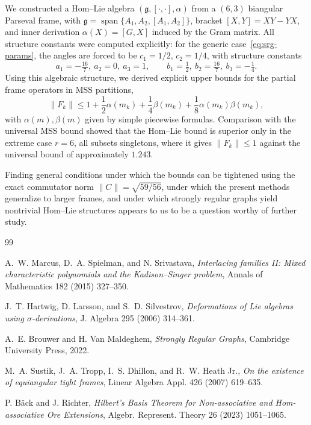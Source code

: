 \documentclass[a4paper]{amsart}
\theoremstyle{plain}
\theoremstyle{definition}
\theoremstyle{remark}
\newcommand{\g}{\mathfrak{g}}
\begin{document}
	We constructed a Hom--Lie algebra $(\g, [\cdot,\cdot], \alpha)$ from a $(6,3)$ biangular Parseval frame, with $\g = \operatorname{span}\{A_1, A_2, [A_1,A_2]\}$, bracket $[X,Y] = XY - YX$, and inner derivation $\alpha(X) = [G,X]$ induced by the Gram matrix. All structure constants were computed explicitly: for the generic case~\eqref{eq:srg-params}, the angles are forced to be $c_1=1/2$, $c_2=1/4$, with structure constants
	\[
	a_1=-\tfrac{16}{7},\ a_2=0,\ a_3=1,\qquad b_1=\tfrac{1}{2},\ b_2=\tfrac{16}{7},\ b_3=-\tfrac{1}{4}.
	\]
	Using this algebraic structure, we derived explicit upper bounds for the partial frame operators in MSS partitions,
	\[
	\|F_k\| \le 1 + \frac{1}{2}\alpha(m_k) + \frac{1}{4}\beta(m_k) + \frac{1}{8}\alpha(m_k)\beta(m_k),
	\]
	with $\alpha(m),\beta(m)$ given by simple piecewise formulas. Comparison with the universal MSS bound showed that the Hom--Lie bound is superior only in the extreme case $r=6$, all subsets singletons, where it gives $\|F_k\| \le 1$ against the universal bound of approximately $1.243$.
	
	Finding general conditions under which the bounds can be tightened using the exact commutator norm $\|C\| = \sqrt{59/56}$, under which the present methods generalize to larger frames, and under which strongly regular graphs yield nontrivial Hom--Lie structures appears to us to be a question worthy of further study.
	
	\begin{thebibliography}{99}
		
		 A.~W. Marcus, D.~A. Spielman, and N. Srivastava, {\em Interlacing families II: Mixed characteristic polynomials and the Kadison--Singer problem}, Annals of Mathematics 182 (2015) 327--350.
		
		 J.~T. Hartwig, D. Larsson, and S.~D. Silvestrov, {\em Deformations of Lie algebras using $\sigma$-derivations}, J. Algebra 295 (2006) 314--361.
		
		 A.~E. Brouwer and H. Van Maldeghem, {\em Strongly Regular Graphs}, Cambridge University Press, 2022.
		
		 M.~A. Sustik, J.~A. Tropp, I.~S. Dhillon, and R.~W. Heath Jr., {\em On the existence of equiangular tight frames}, Linear Algebra Appl. 426 (2007) 619--635.
		
		 P. B\"ack and J. Richter, {\em Hilbert's Basis Theorem for Non-associative and Hom-associative Ore Extensions}, Algebr. Represent. Theory 26 (2023) 1051--1065.
		
	\end{thebibliography}
	
\end{document}
